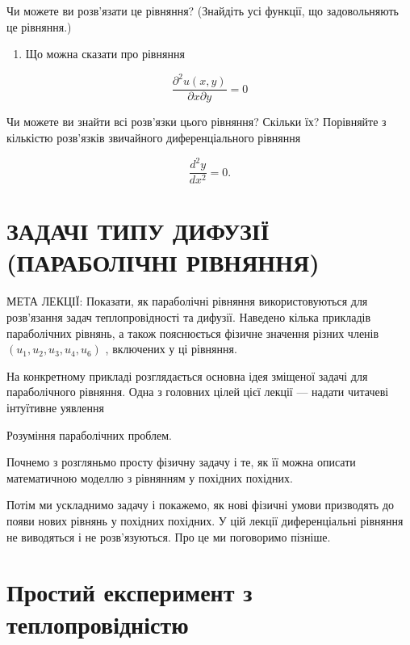 \documentclass[
  ukrainian,
]{article}
\providecommand{\tightlist}{%
  \setlength{\itemsep}{0pt}\setlength{\parskip}{0pt}}
\begin{document}
Чи можете ви розв'язати це рівняння? (Знайдіть усі функції, що
задовольняють це рівняння.)

\begin{enumerate}
\def\labelenumi{\arabic{enumi}.}
\setcounter{enumi}{4}
\tightlist
\item
  Що можна сказати про рівняння
\end{enumerate}

\[\frac{\partial^2 u(x, y)}{\partial x \partial y} = 0\]

Чи можете ви знайти всі розв'язки цього рівняння? Скільки їх? Порівняйте
з кількістю розв'язків звичайного диференціального рівняння

\[\frac{d^2y}{dx^2} = 0.\]

\section{ЗАДАЧІ ТИПУ ДИФУЗІЇ (ПАРАБОЛІЧНІ
РІВНЯННЯ)}\label{ux437ux430ux434ux430ux447ux456-ux442ux438ux43fux443-ux434ux438ux444ux443ux437ux456ux457-ux43fux430ux440ux430ux431ux43eux43bux456ux447ux43dux456-ux440ux456ux432ux43dux44fux43dux43dux44f}

МЕТА ЛЕКЦІЇ: Показати, як параболічні рівняння використовуються для
розв'язання задач теплопровідності та дифузії. Наведено кілька прикладів
параболічних рівнянь, а також пояснюється фізичне значення різних членів
\((u_1, u_2, u_3, u_4, u_6)\) , включених у ці рівняння.

На конкретному прикладі розглядається основна ідея зміщеної задачі для
параболічного рівняння. Одна з головних цілей цієї лекції --- надати
читачеві інтуїтивне уявлення

Розуміння параболічних проблем.

Почнемо з розгляньмо просту фізичну задачу і те, як її можна описати
математичною моделлю з рівнянням у похідних похідних.

Потім ми ускладнимо задачу і покажемо, як нові фізичні умови призводять
до появи нових рівнянь у похідних похідних. У цій лекції диференціальні
рівняння не виводяться і не розв'язуються. Про це ми поговоримо пізніше.

\section{Простий експеримент з
теплопровідністю}\label{ux43fux440ux43eux441ux442ux438ux439-ux435ux43aux441ux43fux435ux440ux438ux43cux435ux43dux442-ux437-ux442ux435ux43fux43bux43eux43fux440ux43eux432ux456ux434ux43dux456ux441ux442ux44e}
\end{document}
